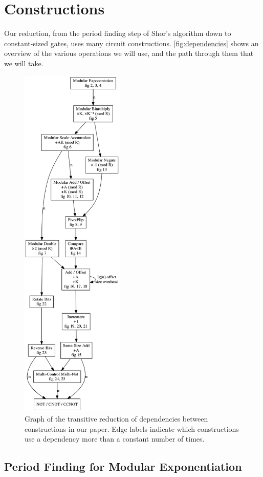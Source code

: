 \documentclass[twocolumn,longbibliography]{quantumarticle}
\begin{document}
\section{Constructions} \label{sec:construct}

Our reduction, from the period finding step of Shor's algorithm down to constant-sized gates, uses many circuit constructions.
\autoref{fig:dependencies} shows an overview of the various operations we will use, and the path through them that we will take.

\begin{figure}
  \centering
  \includegraphics[height=17.3cm]{assets/dependencies.png}
  \caption{
    Graph of the transitive reduction of dependencies between constructions in our paper.
    Edge labels indicate which constructions use a dependency more than a constant number of times.
  }
  \label{fig:dependencies}
\end{figure}

\subsection{Period Finding for Modular Exponentiation}
\end{document}
